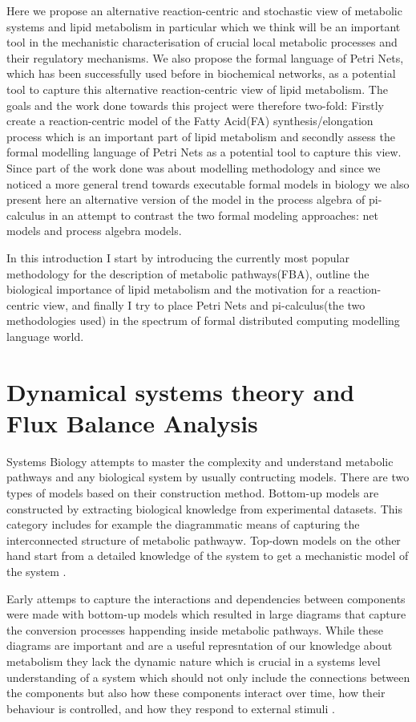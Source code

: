 Here we propose an alternative reaction-centric and stochastic view of metabolic
systems and lipid metabolism in particular which we think will be an important tool in the mechanistic
characterisation of crucial local metabolic processes and their
regulatory mechanisms. We also propose the formal language of Petri
Nets, which has been successfully used before in biochemical networks,
as a potential tool to capture this alternative reaction-centric view
of lipid metabolism. The goals and the work done towards this project were therefore two-fold:
Firstly create a reaction-centric model of the Fatty Acid(FA)
synthesis/elongation process which is an important part of lipid
metabolism and secondly assess the formal modelling language of Petri
Nets as a potential tool to capture this view. Since part of the work
done was about modelling methodology and since we noticed a more
general trend towards executable formal models in biology \cite [] {fisher2007executable} we also
present here an alternative version of the model in the process
algebra of  pi-calculus in an attempt to contrast the two formal
modeling approaches: net models and process algebra models.

In this introduction I start by introducing the currently most popular
methodology for the description of metabolic pathways(FBA),
outline the biological importance of lipid metabolism and the
motivation for a reaction-centric view, and finally I try to place
Petri Nets and pi-calculus(the two methodologies used) in the spectrum
of formal
distributed computing modelling language world.

\section{Dynamical systems theory and Flux Balance Analysis}
Systems Biology attempts to master the complexity and understand metabolic
pathways and any biological system by usually contructing
models. There are two types of models based on their construction
method. Bottom-up models are constructed by extracting biological
knowledge from experimental datasets. This category includes for
example the diagrammatic means of capturing the interconnected
structure of metabolic pathwayw. Top-down models on the other hand
start from a detailed knowledge of the system to get a mechanistic
model of the system \cite [] {schneider2013understanding}.

Early attemps to capture the interactions and dependencies between
components were made with bottom-up models which resulted in large diagrams that
capture the conversion processes happending inside metabolic pathways. While these
diagrams are important and are a useful represntation of our knowledge
about metabolism they lack the dynamic nature which is crucial in a
systems level understanding of a system which should not only include
the connections between the components but also how these components
interact over time, how their behaviour is
controlled, and how they respond to external stimuli \cite [] {kitano2002systems}.

